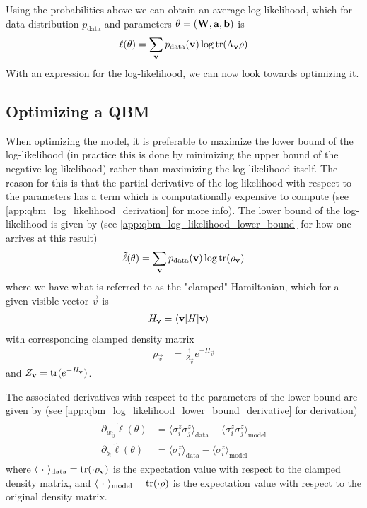 Using the probabilities above we can obtain an average log-likelihood, which for data distribution \( p_\text{data} \) and parameters \( \theta = (\mathbf{W}, \mathbf{a}, \mathbf{b}) \) is
\begin{align}
    \ell(\theta) = \sum_{\mathbf{v}} p_{\text{data}}(\mathbf{v}) \log \text{tr}(\Lambda_{\mathbf{v}}\rho)
\end{align}
With an expression for the log-likelihood, we can now look towards optimizing it.

\subsection{Optimizing a QBM}
When optimizing the model, it is preferable to maximize the lower bound of the log-likelihood (in practice this is done by minimizing the upper bound of the negative log-likelihood) rather than maximizing the log-likelihood itself.
The reason for this is that the partial derivative of the log-likelihood with respect to the parameters has a term which is computationally expensive to compute (see \cref{app:qbm_log_likelihood_derivation} for more info).
The lower bound of the log-likelihood is given by (see \cref{app:qbm_log_likelihood_lower_bound} for how one arrives at this result)
\begin{align}
    \tilde{\ell}(\theta) = \sum_{\mathbf{v}} p_{\text{data}}(\mathbf{v}) \log \text{tr}(\rho_{\mathbf{v}})
\end{align}
where we have what is referred to as the "clamped" Hamiltonian, which for a given visible vector \( \vec{v} \) is
\begin{align}
    H_{\mathbf{v}}
        &= \braket{\mathbf{v}|H|\mathbf{v}}
\end{align}
with corresponding clamped density matrix
\begin{align}
    \rho_\vec{v}
        &= \frac{1}{Z_\vec{v}} e^{-H_\vec{v}}
\end{align}
and \( Z_{\mathbf{v}} = \text{tr}(e^{-H_{\mathbf{v}}}) \).

The associated derivatives with respect to the parameters of the lower bound are given by (see \cref{app:qbm_log_likelihood_lower_bound_derivative} for derivation)
\begin{align}
\begin{split}
    \partial_{w_{ij}} \tilde{\ell}(\theta)
        &= \langle \sigma_i^z \sigma_j^z \rangle_\text{data} - \langle \sigma_i^z \sigma_j^z \rangle_\text{model} \\
    \partial_{b_i} \tilde{\ell}(\theta)
        &= \langle \sigma_i^z \rangle_\text{data} - \langle \sigma_i^z \rangle_\text{model}
\end{split}
\end{align}
where \( \langle \ \cdot \ \rangle_\text{data} = \text{tr}(\cdot \rho_{\mathbf{v}}) \) is the expectation value with respect to the clamped density matrix, and \( \langle \ \cdot \ \rangle_\text{model} = \tr(\cdot \rho) \) is the expectation value with respect to the original density matrix.


